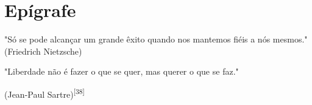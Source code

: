 \chapter*{Epígrafe}

\noindent 

"Só se pode alcançar um grande êxito quando nos mantemos fiéis a nós mesmos."\\

(Friedrich Nietzsche)

"Liberdade não é fazer o que se quer, mas querer o que se faz."

(Jean-Paul Sartre)\textsuperscript{[38]}

